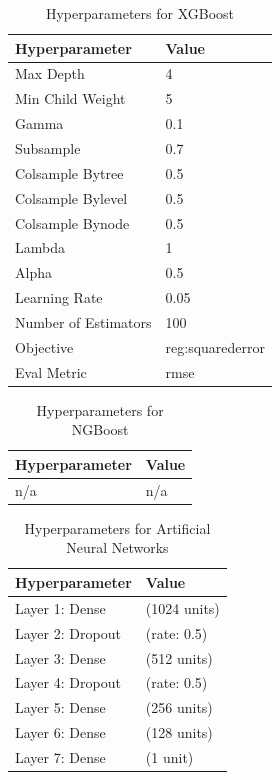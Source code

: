 \begin{table}[H]
\centering
\caption{Hyperparameters for XGBoost}
\begin{tabular}{ll}
    \toprule
    \textbf{Hyperparameter} & \textbf{Value} \\
    \midrule
    Max Depth & 4 \\
    Min Child Weight & 5 \\
    Gamma & 0.1 \\
    Subsample & 0.7 \\
    Colsample Bytree & 0.5 \\
    Colsample Bylevel & 0.5 \\
    Colsample Bynode & 0.5 \\
    Lambda & 1 \\
    Alpha & 0.5 \\
    Learning Rate & 0.05 \\
    Number of Estimators & 100 \\
    Objective & reg:squarederror \\
    Eval Metric & rmse \\
    \bottomrule
\end{tabular}
\label{tab:xgboost_hyperparameters}
\end{table}
\FloatBarrier

\begin{table}[H]
\centering
\caption{Hyperparameters for NGBoost}
\begin{tabular}{ll}
    \toprule
    \textbf{Hyperparameter} & \textbf{Value} \\
    \midrule
    n/a & n/a \\
    \bottomrule
\end{tabular}
\label{tab:ngboost_hyperparameters}
\end{table}
\FloatBarrier

\begin{table}[H]
\centering
\caption{Hyperparameters for Artificial Neural Networks}
\begin{tabular}{ll}
    \toprule
    \textbf{Hyperparameter} & \textbf{Value} \\
    \midrule
    Layer 1: Dense & (1024 units) \\
    Layer 2: Dropout & (rate: 0.5) \\
    Layer 3: Dense & (512 units) \\
    Layer 4: Dropout & (rate: 0.5) \\
    Layer 5: Dense & (256 units) \\
    Layer 6: Dense & (128 units) \\
    Layer 7: Dense & (1 unit) \\
    \bottomrule
\end{tabular}
\label{tab:ann_hyperparameters}
\end{table}
\FloatBarrier

